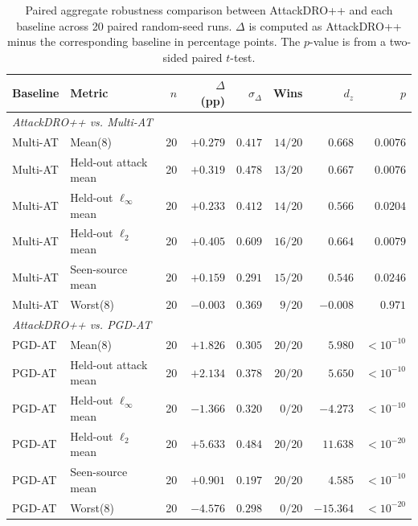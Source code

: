 \begin{table}[H]
\centering
\caption[Paired aggregate robustness]{Paired aggregate robustness comparison between AttackDRO++ and each baseline across 20 paired random-seed runs.
\(\Delta\) is computed as AttackDRO++ minus the corresponding baseline in percentage
points. The \(p\)-value is from a two-sided paired \(t\)-test.}
\label{tab:ch6_paired_aggregate_all_baselines}
\footnotesize
\setlength{\tabcolsep}{3pt}
\renewcommand{\arraystretch}{1.08}
\begin{tabular}{llrrrrrr}
\toprule
Baseline & Metric & \(n\) & \(\Delta\) (pp) & \(\sigma_\Delta\) & Wins & \(d_z\) & \(p\) \\
\midrule

\multicolumn{8}{l}{\textit{AttackDRO++ vs. Multi-AT}} \\
\midrule
 Multi-AT & Mean(8) & 20 & $+0.279$ & $0.417$ & $14/20$ & $0.668$ & $0.0076$ \\
 Multi-AT & Held-out attack mean & 20 & $+0.319$ & $0.478$ & $13/20$ & $0.667$ & $0.0076$ \\
 Multi-AT & Held-out $\ell_\infty$ mean & 20 & $+0.233$ & $0.412$ & $14/20$ & $0.566$ & $0.0204$ \\
 Multi-AT & Held-out $\ell_2$ mean & 20 & $+0.405$ & $0.609$ & $16/20$ & $0.664$ & $0.0079$ \\
 Multi-AT & Seen-source mean & 20 & $+0.159$ & $0.291$ & $15/20$ & $0.546$ & $0.0246$ \\
 Multi-AT & Worst(8) & 20 & $-0.003$ & $0.369$ & $9/20$ & $-0.008$ & $0.971$ \\

\midrule
\multicolumn{8}{l}{\textit{AttackDRO++ vs. PGD-AT}} \\
\midrule
PGD-AT & Mean(8) & 20 & $+1.826$ & $0.305$ & $20/20$ & $5.980$ & $<10^{-10}$ \\
PGD-AT & Held-out attack mean & 20 & $+2.134$ & $0.378$ & $20/20$ & $5.650$ & $<10^{-10}$ \\
PGD-AT & Held-out $\ell_\infty$ mean & 20 & $-1.366$ & $0.320$ & $0/20$ & $-4.273$ & $<10^{-10}$ \\
PGD-AT & Held-out $\ell_2$ mean & 20 & $+5.633$ & $0.484$ & $20/20$ & $11.638$ & $<10^{-20}$ \\
PGD-AT & Seen-source mean & 20 & $+0.901$ & $0.197$ & $20/20$ & $4.585$ & $<10^{-10}$ \\
PGD-AT & Worst(8) & 20 & $-4.576$ & $0.298$ & $0/20$ & $-15.364$ & $<10^{-20}$ \\


\end{tabular}
\end{table}
